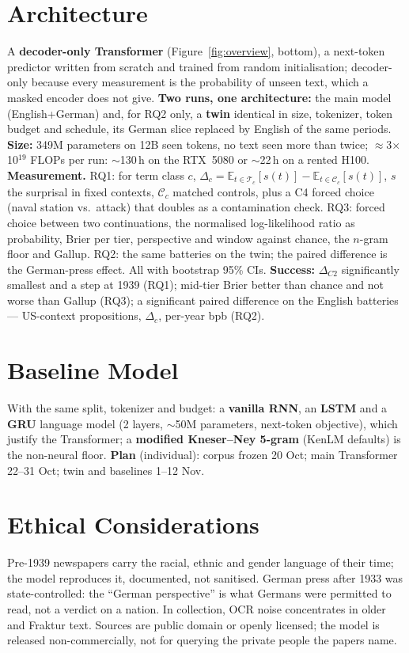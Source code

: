\documentclass[final]{article}
\let\oldsection\section
\renewcommand{\section}{\vspace{-0.3em}\oldsection}
\begin{document}
\section*{Architecture}
A \textbf{decoder-only Transformer} (Figure~\ref{fig:overview}, bottom), a next-token
predictor written from scratch and trained from random initialisation; decoder-only because every
measurement is the probability of unseen text, which a masked encoder does not give. \textbf{Two runs, one architecture:} the main
model (English+German) and, for RQ2 only, a \textbf{twin} identical in size, tokenizer,
token budget and schedule, its German slice replaced by English of the same periods. \textbf{Size:}
349M parameters on 12B seen tokens, no text seen more than twice; $\approx$3$\times$10$^{19}$
FLOPs per run: $\sim$130\,h on the RTX~5080 or $\sim$22\,h on a rented H100. \textbf{Measurement.}
RQ1: for term class $c$, $\Delta_c=\mathbb{E}_{t\in\mathcal{T}_c}[s(t)]-
\mathbb{E}_{t\in\mathcal{C}_c}[s(t)]$, $s$ the surprisal in fixed contexts,
$\mathcal{C}_c$ matched controls, plus a C4 forced choice (naval station vs.\ attack) that doubles as a
contamination check. RQ3: forced choice between two continuations, the normalised log-likelihood
ratio as probability, Brier per tier, perspective and window against chance,
the $n$-gram floor and Gallup. RQ2: the same batteries on the twin; the paired difference is the
German-press effect. All with bootstrap 95\% CIs. \textbf{Success:} $\Delta_{C2}$
significantly smallest and a step at 1939 (RQ1); mid-tier Brier better than
chance and not worse than Gallup (RQ3); a significant paired difference on
the English batteries --- US-context propositions, $\Delta_c$, per-year bpb (RQ2).

\section*{Baseline Model}
With the same split, tokenizer and budget:
a \textbf{vanilla RNN}, an \textbf{LSTM} and a \textbf{GRU} language model
(2 layers, $\sim$50M parameters, next-token objective), which justify the
Transformer; a \textbf{modified Kneser--Ney 5-gram} (KenLM
defaults) is the non-neural floor. \textbf{Plan} (individual): corpus frozen 20
Oct; main Transformer 22--31 Oct; twin and baselines 1--12 Nov.

\section*{Ethical Considerations}
Pre-1939 newspapers carry the racial, ethnic and gender language of their
time; the model reproduces it, documented, not sanitised. German press after
1933 was state-controlled: the ``German perspective'' is what Germans were
permitted to read, not a verdict on a nation. In
collection, OCR noise concentrates in older and Fraktur text. Sources are public domain or openly licensed; the model is
released non-commercially, not for querying the private people the papers name.

\newpage


\end{document}
